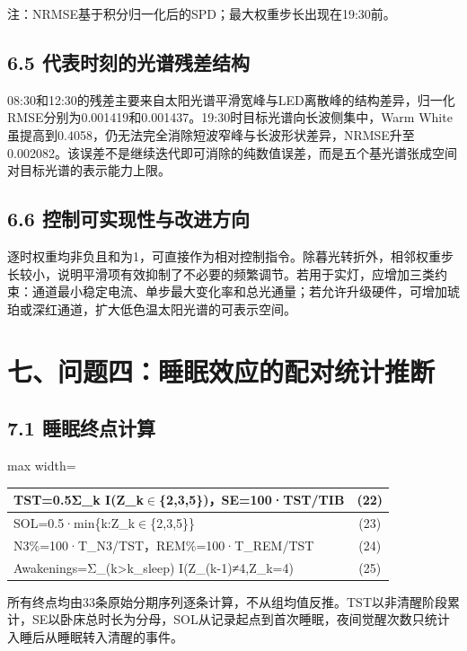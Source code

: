 \documentclass[UTF8,a4paper,12pt]{ctexart}
\begin{document}
注：NRMSE基于积分归一化后的SPD；最大权重步长出现在19:30前。

\subsection{6.5 代表时刻的光谱残差结构}

08:30和12:30的残差主要来自太阳光谱平滑宽峰与LED离散峰的结构差异，归一化RMSE分别为0.001419和0.001437。19:30时目标光谱向长波侧集中，Warm White虽提高到0.4058，仍无法完全消除短波窄峰与长波形状差异，NRMSE升至0.002082。该误差不是继续迭代即可消除的纯数值误差，而是五个基光谱张成空间对目标光谱的表示能力上限。

\subsection{6.6 控制可实现性与改进方向}

逐时权重均非负且和为1，可直接作为相对控制指令。除暮光转折外，相邻权重步长较小，说明平滑项有效抑制了不必要的频繁调节。若用于实灯，应增加三类约束：通道最小稳定电流、单步最大变化率和总光通量；若允许升级硬件，可增加琥珀或深红通道，扩大低色温太阳光谱的可表示空间。

\section{七、问题四：睡眠效应的配对统计推断}

\subsection{7.1 睡眠终点计算}

\begin{table}[H]
\centering
\small
\begin{adjustbox}{max width=\textwidth}
\begin{tabular}{lc}
\toprule
TST=0.5Σ\_k I(Z\_k$\in$\{2,3,5\})，SE=100·TST/TIB & (22) \\
\midrule
SOL=0.5·min\{k:Z\_k$\in$\{2,3,5\}\} & (23) \\
N3\%=100·T\_N3/TST，REM\%=100·T\_REM/TST & (24) \\
Awakenings=Σ\_(k>k\_sleep) I(Z\_(k-1)≠4,Z\_k=4) & (25) \\
\bottomrule
\end{tabular}
\end{adjustbox}
\end{table}

所有终点均由33条原始分期序列逐条计算，不从组均值反推。TST以非清醒阶段累计，SE以卧床总时长为分母，SOL从记录起点到首次睡眠，夜间觉醒次数只统计入睡后从睡眠转入清醒的事件。
\end{document}
